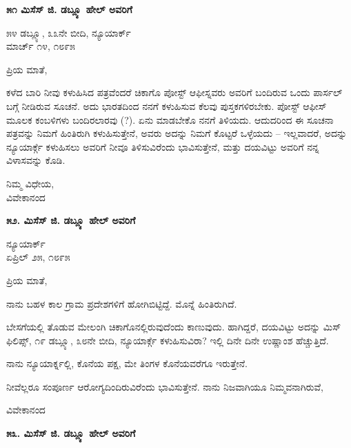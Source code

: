 \begin{center}
\textbf{೫೧ ಮಿಸೆಸ್ ಜಿ. ಡಬ್ಲ್ಯೂ ಹೇಲ್ ಅವರಿಗೆ}
\end{center}

\begin{flushright}
೫೪ ಡಬ್ಲ್ಯೂ, ೩೩ನೇ ಬೀದಿ, ನ್ಯೂಯಾರ್ಕ್\\ಮಾರ್ಚ್ ೧೪, ೧೮೯೫
\end{flushright}

ಪ್ರಿಯ ಮಾತೆ,

ಕಳೆದ ಬಾರಿ ನೀವು ಕಳುಹಿಸಿದ ಪತ್ರವೆಂದರೆ ಚಿಕಾಗೊ ಪೋಸ್ಟ್ ಆಫೀಸ್ನವರು ಅವರಿಗೆ ಬಂದಿರುವ ಒಂದು ಪಾರ್ಸಲ್ ಬಗ್ಗೆ ನೀಡಿರುವ ಸೂಚನೆ. ಅದು ಭಾರತದಿಂದ ನನಗೆ ಕಳುಹಿಸುವ ಕೆಲವು ಪುಸ್ತಕಗಳಿರಬೇಕು. ಪೋಸ್ಟ್ ಆಫೀಸ್ ಮೂಲಕ ಕಂಬಳಿಗಳು ಬಂದಿರಲಾರವು (?). ಏನು ಮಾಡಬೇಕೊ ನನಗೆ ತಿಳಿಯದು. ಆದುದರಿಂದ ಈ ಸೂಚನಾ ಪತ್ರವನ್ನು ನಿಮಗೆ ಹಿಂತಿರುಗಿ ಕಳುಹಿಸುತ್ತೇನೆ, ಅವರು ಅದನ್ನು ನಿಮಗೆ ಕೊಟ್ಟರೆ ಒಳ್ಳೆಯದು – ಇಲ್ಲವಾದರೆ, ಅದನ್ನು ನ್ಯೂಯಾರ್ಕ್ಗೆ ಕಳುಹಿಸಲು ಅವರಿಗೆ ನೀವೂ ತಿಳಿಸುವಿರೆಂದು ಭಾವಿಸುತ್ತೇನೆ, ಮತ್ತು ದಯವಿಟ್ಟು ಅವರಿಗೆ ನನ್ನ ವಿಳಾಸವನ್ನು ಕೊಡಿ.

\begin{flushright}
ನಿಮ್ಮ ವಿಧೇಯ,\\ವಿವೇಕಾನಂದ
\end{flushright}

\begin{center}
\textbf{೫೨. ಮಿಸೆಸ್ ಜಿ. ಡಬ್ಲ್ಯೂ ಹೇಲ್ ಅವರಿಗೆ}
\end{center}

\begin{flushright}
ನ್ಯೂಯಾರ್ಕ್\\ಏಪ್ರಿಲ್ ೨೫, ೧೮೯೫
\end{flushright}

ಪ್ರಿಯ ಮಾತೆ,

ನಾನು ಬಹಳ ಕಾಲ ಗ್ರಾಮ ಪ್ರದೇಶಗಳಿಗೆ ಹೋಗಿಬಿಟ್ಟಿದ್ದೆ. ಮೊನ್ನೆ ಹಿಂತಿರುಗಿದೆ.

ಬೇಸಗೆಯಲ್ಲಿ ತೊಡುವ ಮೇಲಂಗಿ ಚಿಕಾಗೊನಲ್ಲಿರುವುದೆಂದು ಕಾಣುವುದು. ಹಾಗಿದ್ದರೆ, ದಯವಿಟ್ಟು ಅದನ್ನು  ಮಿಸ್ ಫಿಲಿಪ್ಸ್, ೧೯ ಡಬ್ಲ್ಯೂ, ೩೮ನೇ ಬೀದಿ, ನ್ಯೂಯಾರ್ಕ್ಗೆ ಕಳುಹಿಸುವಿರಾ? ಇಲ್ಲಿ ದಿನೇ ದಿನೇ ಉಷ್ಣಾಂಶ ಹೆಚ್ಚುತ್ತಿದೆ.

ನಾನು ನ್ಯೂಯಾರ್ಕ್ನಲ್ಲಿ, ಕೊನೆಯ ಪಕ್ಷ, ಮೇ ತಿಂಗಳ ಕೊನೆಯವರೆಗೂ ಇರುತ್ತೇನೆ.

ನೀವೆಲ್ಲರೂ ಸಂಪೂರ್ಣ ಆರೋಗ್ಯದಿಂದಿರುವಿರೆಂದು ಭಾವಿಸುತ್ತೇನೆ. ನಾನು ನಿಜವಾಗಿಯೂ ನಿಮ್ಮವನಾಗಿರುವೆ,

\begin{flushright}
ವಿವೇಕಾನಂದ
\end{flushright}

\begin{center}
\textbf{೫೩. ಮಿಸೆಸ್ ಜಿ. ಡಬ್ಲ್ಯೂ ಹೇಲ್ ಅವರಿಗೆ}
\end{center}

